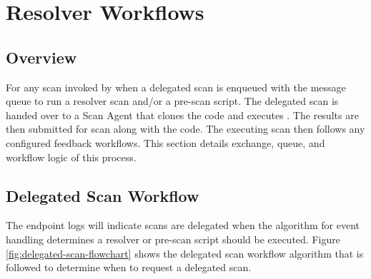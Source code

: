 \chapter{Resolver Workflows}\label{sec:resolver-workflows}

\section{Overview}
For any scan invoked by \cxoneflow\space when  
a delegated scan is enqueued with the message queue to run a resolver scan and/or a pre-scan script.  The delegated scan is handed over
to a Scan Agent that clones the code and executes \scaresolver.  The \scaresolver results are
then submitted for scan along with the code.  The executing scan then follows any configured feedback workflows.
This section details exchange, queue, and workflow logic of this process.


\section{Delegated Scan Workflow}

The \cxoneflow endpoint logs will indicate scans are delegated when the algorithm for event handling
determines a resolver or pre-scan script should be executed.  Figure \ref{fig:delegated-scan-flowchart} shows the delegated scan
workflow algorithm that is followed to determine when to request a delegated scan.  


